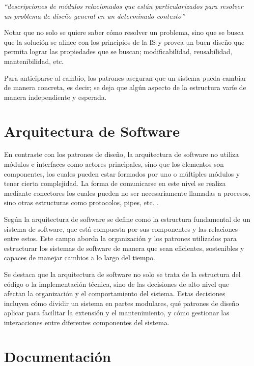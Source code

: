 \textit{``descripciones de módulos relacionados que están particularizados para resolver un problema de diseño general en un determinado contexto''}

Notar que no solo se quiere saber cómo resolver un problema, sino que se busca que la solución se alinee con los principios de la \gls{IS} y provea un buen diseño que permita lograr las propiedades que se buscan; modificabilidad, reusabilidad, mantenibilidad, etc.

Para anticiparse al cambio, los patrones aseguran que un sistema pueda cambiar de manera concreta, es decir; se deja que algún aspecto de la estructura varíe de manera independiente y esperada.


\section{Arquitectura de Software}
\label{secArq}

En contraste con los patrones de diseño, la arquitectura de software no utiliza módulos e interfaces como actores principales, sino que los elementos son componentes, los cuales pueden estar formados por uno o múltiples módulos y tener cierta complejidad. La forma de comunicarse en este nivel se realiza mediante conectores los cuales pueden no ser necesariamente llamadas a procesos, sino otras estructuras como protocolos, pipes, etc. \cite{bass2003, buschmann1996posa1}.

Según \cite{ShawGarlan1996} la arquitectura de software se define como la estructura fundamental de un sistema de software, que está compuesta por sus componentes y las relaciones entre estos. Este campo aborda la organización y los patrones utilizados para estructurar los sistemas de software de manera que sean eficientes, sostenibles y capaces de manejar cambios a lo largo del tiempo.

Se destaca que la arquitectura de software no solo se trata de la estructura del código o la implementación técnica, sino de las decisiones de alto nivel que afectan la organización y el comportamiento del sistema. Estas decisiones incluyen cómo dividir un sistema en partes modulares, qué patrones de diseño aplicar para facilitar la extensión y el mantenimiento, y cómo gestionar las interacciones entre diferentes componentes del sistema.

\section{Documentación}
\label{secDocumentacion}

